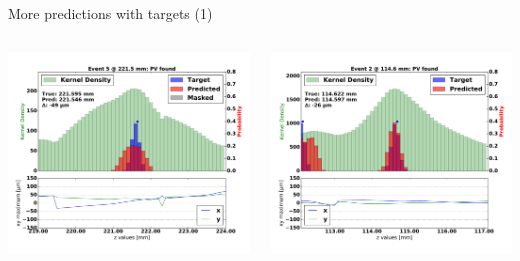 
\begin{frame}{More predictions with targets (1)}
  \begin{columns}[c]
        \begin{center}
           \includegraphics[width=1\textwidth, trim=60 0 60 0]{images/07Jan19_AltCNN4Layer_D35_sp_31.pdf}
        \end{center}
        \begin{center}
           \includegraphics[width=1\textwidth, trim=60 0 60 0]{images/07Jan19_AltCNN4Layer_D35_sp_12.pdf}
       \end{center}
  \end{columns}
\end{frame}


